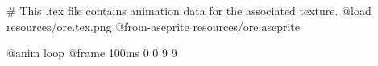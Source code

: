 # This .tex file contains animation data for the associated texture.
@load resources/ore.tex.png
@from-aseprite resources/ore.aseprite

@anim loop
	@frame 100ms 0 0 9 9
